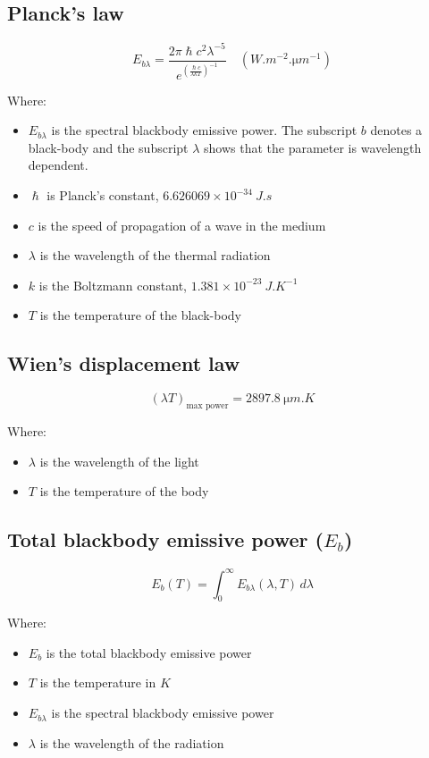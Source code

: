 \documentclass[11pt]{article}
\begin{document}
\subsection{Planck's law}
\label{sec:org6e6d02e}
\[E_{b \lambda} = \frac{2 \pi \hslash c^2 \lambda^{-5}}{e^{\left(\frac{\hslash c}{\lambda k T} \right)^{-1}}} \quad (\unit{W.m^{-2}.\micro m^{-1}})\]

Where:
\begin{itemize}
\item \(E_{b \lambda}\) is the spectral blackbody emissive power. The subscript \(b\) denotes a black-body and the subscript \(\lambda\) shows that the parameter is wavelength dependent.
\item \(\hslash\) is Planck's constant, \(6.626069 \times 10^{-34} \ \unit{J.s}\)
\item \(c\) is the speed of propagation of a wave in the medium
\item \(\lambda\) is the wavelength of the thermal radiation
\item \(k\) is the Boltzmann constant, \(1.381 \times 10^{-23} \ \unit{J.K^{-1}}\)
\item \(T\) is the temperature of the black-body
\end{itemize}

\subsection{Wien's displacement law}
\label{sec:orgc2b6564}
\[(\lambda T)_{\text{max power}} = \qty{2897.8}{\micro m.K}\]

Where:
\begin{itemize}
\item \(\lambda\) is the wavelength of the light
\item \(T\) is the temperature of the body
\end{itemize}

\subsection{Total blackbody emissive power (\(E_b\))}
\label{sec:orgf75913c}
\[E_b (T) = \int_0^{\infty} E_{b \lambda} (\lambda, T) \, d \lambda\]

Where:
\begin{itemize}
\item \(E_b\) is the total blackbody emissive power
\item \(T\) is the temperature in \(\unit{K}\)
\item \(E_{b \lambda}\) is the spectral blackbody emissive power
\item \(\lambda\) is the wavelength of the radiation
\end{itemize}
\end{document}
